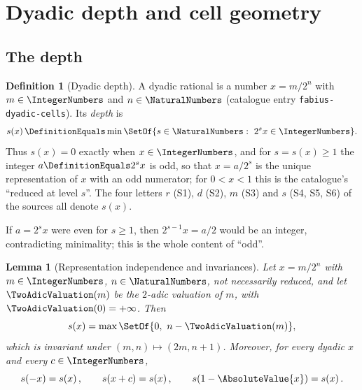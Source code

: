 \documentclass[11pt,oneside]{article}
\theoremstyle{plain}
\newtheorem{lemma}[theorem]{Lemma}
\theoremstyle{definition}
\newtheorem{definition}[theorem]{Definition}
\theoremstyle{remark}
\newcommand{\dep}[1]{s\!\left(#1\right)}                    %
\begin{document}
\section{Dyadic depth and cell geometry}
\label{due:sec:depth}

\subsection{The depth}
\label{due:sec:set-depth-def}

\begin{definition}[Dyadic depth]
\label{due:def:set-depth}
A dyadic rational is a number $x=m/2^{n}$ with $m\in\IntegerNumbers$ and
$n\in\NaturalNumbers$ (catalogue entry \texttt{fabius-dyadic-cells}).  Its
\emph{depth} is
\begin{equation}
 \dep{x}\DefinitionEquals\min\SetOf{s\in\NaturalNumbers:\ 2^{s}x\in\IntegerNumbers}.
 \label{due:eq:set-depth}
\end{equation}
Thus $\dep{x}=0$ exactly when $x\in\IntegerNumbers$, and for $s=\dep{x}\ge1$
the integer $a\DefinitionEquals2^{s}x$ is odd, so that $x=a/2^{s}$ is the
unique representation of $x$ with an odd numerator; for $0<x<1$ this is the
catalogue's ``reduced at level $s$''.  The four letters $r$ (S1), $d$
(S2), $m$ (S3) and $s$ (S4, S5, S6) of the sources all denote $\dep{x}$.
\end{definition}

If $a=2^{s}x$ were even for $s\ge1$, then $2^{s-1}x=a/2$ would be an integer,
contradicting minimality; this is the whole content of ``odd''.

\begin{lemma}[Representation independence and invariances]
\label{due:lem:set-depth-representation}
Let $x=m/2^{n}$ with $m\in\IntegerNumbers$, $n\in\NaturalNumbers$, not
necessarily reduced, and let $\TwoAdicValuation(m)$ be the $2$-adic
valuation of $m$, with $\TwoAdicValuation(0)=+\infty$.  Then
\begin{equation}
 \dep{x}=\max\SetOf{0,\ n-\TwoAdicValuation(m)},
 \label{due:eq:set-depth-valuation}
\end{equation}
which is invariant under $(m,n)\mapsto(2m,n+1)$.  Moreover, for every
dyadic $x$ and every $c\in\IntegerNumbers$,
\begin{equation}
 \dep{-x}=\dep{x},\qquad \dep{x+c}=\dep{x},\qquad
 \dep{1-\AbsoluteValue{x}}=\dep{x}.
 \label{due:eq:set-depth-invariances}
\end{equation}
\end{lemma}
\end{document}
